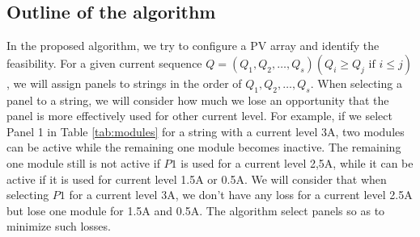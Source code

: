 \documentclass[conference]{IEEEtran}
\begin{document}

\subsection{Outline of the algorithm}

In the proposed algorithm, we try to configure a PV array and identify the feasibility. For a given current sequence $Q = (Q_{1},Q_{2},\ldots ,Q_{s}) (Q_{i} \geq Q_{j} \mbox{\ if\ } i \leq j)$, we will assign panels to strings in the order of $Q_{1},Q_{2},\ldots ,Q_{s}$. When selecting a panel to a string, we will consider how much we lose an opportunity that the panel is more effectively used for other current level. For example, if we select Panel 1 in Table \ref{tab:modules} for a string with a current level 3A, two modules can be active while the remaining one module becomes inactive. 
The remaining one module still is not active if $P1$ is used for a current level 2,5A, while it can be active if it is used for current level 1.5A or 0.5A. We will consider that when selecting $P1$ for a current level 3A, we don't have any loss for a current level 2.5A but lose one module for 1.5A and 0.5A. The algorithm select panels so as to minimize such losses. 
\end{document}
